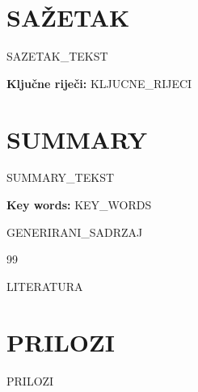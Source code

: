 \documentclass[12pt,a4paper]{article}
\begin{document}
\newpage
\section*{SAŽETAK}
{{SAZETAK_TEKST}}

\vspace{0.75cm}
\noindent \textbf{Ključne riječi:} {{KLJUCNE_RIJECI}}

\newpage
\section*{SUMMARY}
{{SUMMARY_TEKST}}

\vspace{0.75cm}
\noindent \textbf{Key words:} {{KEY_WORDS}}

\newpage
{}
\setcounter{page}{1}

{{GENERIRANI_SADRZAJ}}

\newpage
\begin{thebibliography}{99}
{{LITERATURA}}
\end{thebibliography}

\newpage
\section*{PRILOZI}
{{PRILOZI}}
\end{document}
